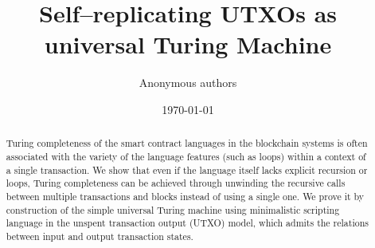 \documentclass[runningheads]{llncs}
\begin{document}
    \title{Self--replicating UTXOs as universal Turing Machine}

    \author{Anonymous authors}

    \date{\today}
    \maketitle

    \begin{abstract}
        Turing completeness of the smart contract languages in the blockchain
        systems is often associated with the variety of the language features
        (such as loops) within a context of a single transaction. We show that
        even if the language itself lacks explicit recursion or loops, Turing
        completeness can be achieved through unwinding the recursive calls between
        multiple transactions and blocks instead of using a single one. We prove
        it by construction of the simple universal Turing machine using
        minimalistic scripting language in the unspent transaction output (UTXO)
        model, which admits the relations between input and output transaction
        states.
    \end{abstract}
\end{document}
